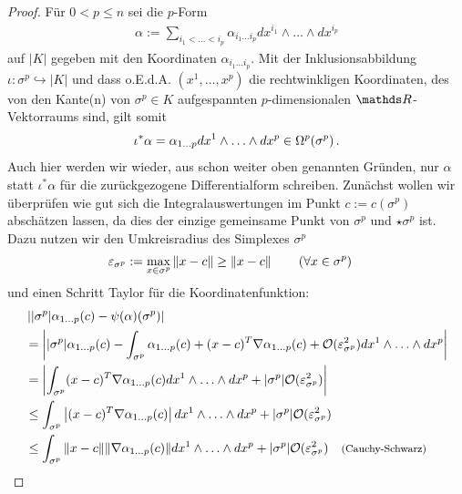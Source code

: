   \begin{proof}
    Für \( 0 < p \le n \) sei die \( p \)-Form 
    \begin{align}
      \alpha := \sum_{i_{1}<\ldots<i_{p}} \alpha_{i_{1}\ldots i_{p}} dx^{i_{1}}\wedge\ldots\wedge dx^{i_{p}}
    \end{align}
    auf \( |K| \) gegeben mit den Koordinaten \(\alpha_{i_{1}\ldots i_{p}} \). 
    Mit der Inklusionsabbildung \( \iota: \sigma^{p} \hookrightarrow |K| \) und dass o.E.d.A. \( \left(
    x^{1},\ldots,x^{p} \right) \) die rechtwinkligen Koordinaten, des von
    den Kante(n) von
    \( \sigma^{p}\in K \) aufgespannten \( p\)-dimensionalen \( \R \)-Vektorraums sind, gilt somit
    \begin{align}
      \iota^{*}\alpha = \alpha_{1\ldots p}dx^{1}\wedge\ldots\wedge dx^{p}\in\Omega^{p}(\sigma^{p}) \,\text{.}
    \end{align}
    Auch hier werden wir wieder, aus schon weiter oben genannten Gründen, nur \( \alpha \) statt \( \iota^{*}\alpha \) für die zurückgezogene Differentialform schreiben.
    Zunächst wollen wir überprüfen wie gut sich die Integralauswertungen im Punkt \( c:=c(\sigma^{p}) \) abschätzen lassen, da dies der einzige gemeinsame Punkt von
    \( \sigma^{p} \) und \( \star\sigma^{p} \) ist.
    Dazu nutzen wir den Umkreisradius des Simplexes  \( \sigma^{p} \)
    \begin{align}
      \varepsilon_{\sigma^{p}} &:= \max_{x\in\sigma^{p}}\|x-c\| \ge \|x-c\| \qquad\left( \forall x \in \sigma^{p} \right)
    \end{align}
    und einen Schritt Taylor für die Koordinatenfunktion:
    \begin{align}
      &\left| |\sigma^{p}|\alpha_{1 \ldots p}(c) - \psi(\alpha)(\sigma^{p})\right| \\
      &=  \left| |\sigma^{p}|\alpha_{1 \ldots p}(c) 
                  - \int_{\sigma^{p}} \alpha_{1 \ldots p}(c) + (x-c)^{T}\nabla\alpha_{1 \ldots p}(c) + \mathcal{O}(\eps_{\sigma^{p}}^{2}) dx^{1}\wedge\ldots\wedge dx^{p} \right| \\
      &= \left| \int_{\sigma^{p}}  (x-c)^{T}\nabla\alpha_{1 \ldots p}(c) dx^{1}\wedge\ldots\wedge dx^{p} 
                    +|\sigma^{p}|\mathcal{O}(\eps_{\sigma^{p}}^{2})\right| \\
      &\le \int_{\sigma^{p}} \left| (x-c)^{T}\nabla\alpha_{1 \ldots p}(c) \right| dx^{1}\wedge\ldots\wedge dx^{p} +|\sigma^{p}| \mathcal{O}(\eps_{\sigma^{p}}^{2}) \\
      &\le \int_{\sigma^{p}} \|x-c\|\|\nabla\alpha_{1 \ldots p}(c)\| dx^{1}\wedge\ldots\wedge dx^{p} +|\sigma^{p}| \mathcal{O}(\eps_{\sigma^{p}}^{2}) \formtext{\footnotesize(Cauchy-Schwarz)}\\

\end{align}
\end{proof}
